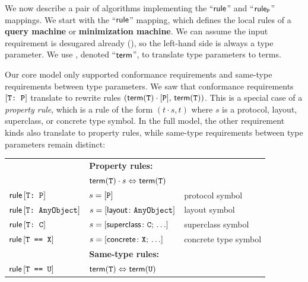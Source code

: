 \documentclass[../generics]{subfiles}
\begin{document}
We now describe a pair of algorithms implementing the ``$\mathsf{rule}$'' and ``$\mathsf{rule}_{\texttt{P}}$'' mappings. We start with the ``$\mathsf{rule}$'' mapping, which defines the local rules of a \textbf{query machine} or \textbf{minimization machine}. We can assume the input requirement is desugared already (), so the left-hand side is always a type parameter. We use , denoted ``$\mathsf{term}$'', to translate type parameters to terms.

Our core model only supported conformance requirements and same-type requirements between type parameters. We saw that conformance requirements $[\texttt{T:~P}]$ translate to rewrite rules $(\mathsf{term}(\texttt{T}) \cdot [\texttt{P}],\, \mathsf{term}(\texttt{T}))$. This is a special case of a \emph{property rule}, which is a rule of the form $(t \cdot s, t)$ where $s$ is a protocol, layout, superclass, or concrete type symbol. In the full model, the other requirement kinds also translate to property rules, while same-type requirements between type parameters remain distinct:
\begin{center}
\begin{tabular}{lll}
\toprule
&\textbf{Property rules:}&\\
&$\mathsf{term}(\texttt{T}) \cdot s \Leftrightarrow \mathsf{term}(\texttt{T})$&\\
\midrule
$\mathsf{rule}\, [\texttt{T:~P}]$ & $s=[\texttt{P}]$&protocol symbol\\
$\mathsf{rule}\, [\texttt{T:~AnyObject}]$ & $s=[\mathsf{layout}\colon\texttt{AnyObject}]$&layout symbol\\
$\mathsf{rule}\, [\texttt{T:~C}]$ & $s=[\mathsf{superclass}\colon \texttt{C};\, \ldots]$&superclass symbol\\
$\mathsf{rule}\, [\texttt{T == X}]$ & $s=[\mathsf{concrete}\colon \texttt{X};\, \ldots]$&concrete type symbol\\
\midrule
&\textbf{Same-type rules:}&\\
$\mathsf{rule}\, [\texttt{T == U}]$ & $\mathsf{term}(\texttt{T})\Leftrightarrow\mathsf{term}(\texttt{U})$&\\
\bottomrule
\end{tabular}
\end{center}

\smallskip
\end{document}
